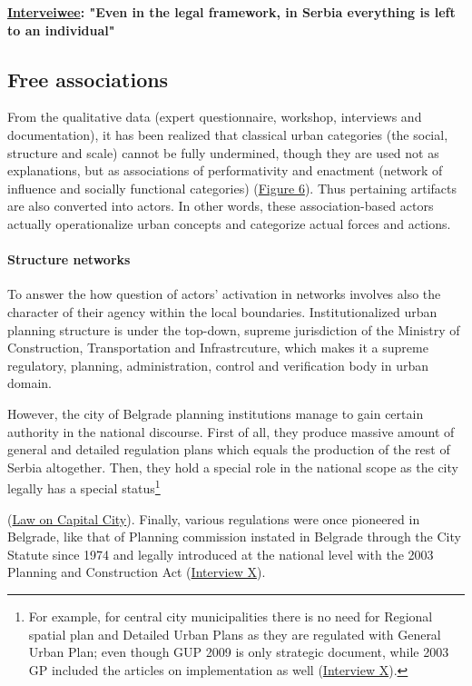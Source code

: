 \documentclass[11pt]{report}
\begin{document}
\textbf{\href{ref}{Interveiwee}:
"Even in the legal framework, in Serbia everything is left to an individual"}

\subsection{Free associations}

From the qualitative data (expert questionnaire, workshop, interviews and documentation), it has been realized that classical urban categories (the social, structure and scale) cannot be fully undermined, though they are used not as explanations, but as associations of performativity and enactment (network of influence and socially functional categories) (\href{ref}{Figure 6}).
Thus pertaining artifacts are also converted into actors.
In other words, these association-based actors actually operationalize urban concepts and categorize actual forces and actions.

\paragraph{Structure networks}

To answer the how question of actors' activation in networks involves also the character of their agency within the local boundaries.
Institutionalized urban planning structure is under the top-down, supreme jurisdiction of the Ministry of Construction, Transportation and Infrastrcuture, which makes it a supreme regulatory, planning, administration, control and verification body in urban domain.

However, the city of Belgrade planning institutions manage to gain certain authority in the national discourse.
First of all, they produce massive amount of general and detailed regulation plans which equals the production of the rest of Serbia altogether.
Then, they hold a special role in the national scope as the city legally has a special status\footnote
{For example, for central city municipalities there is no need for Regional spatial plan and Detailed Urban Plans as they are regulated with General Urban Plan; even though GUP 2009 is only strategic document, while 2003 GP included the articles on implementation as well (\href{InterviewX}{Interview X}).}

(\href{ref}{Law on Capital City}).
Finally, various regulations were once pioneered in Belgrade, like that of Planning commission instated in Belgrade through the City Statute since 1974 and legally introduced at the national level with the 2003 Planning and Construction Act (\href{InterviewX}{Interview X}).
\end{document}

